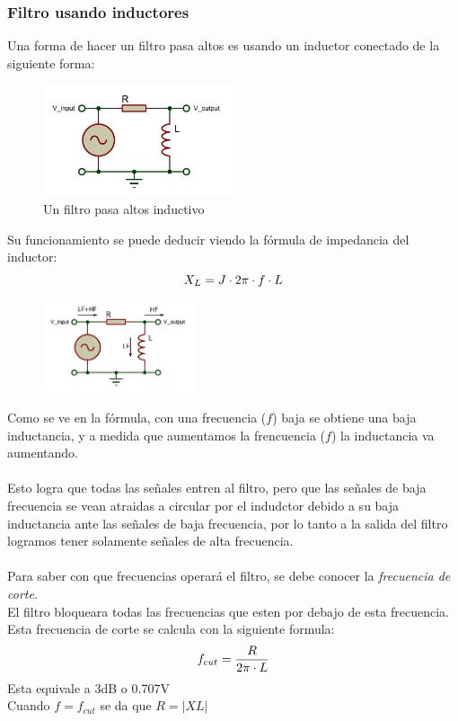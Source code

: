 \documentclass[../main.tex]{subfiles}
\begin{document}
		\clearpage
		\subsubsection{Filtro usando inductores}
		Una forma de hacer un filtro pasa altos es usando un inductor conectado 
		de la siguiente forma:
		\begin{figure}[H]
			\centering
			\includegraphics[width=0.5\textwidth]{filtros/pasa-alto_ind1.pdf}
			\caption{Un filtro pasa altos inductivo}

		\end{figure}
		Su funcionamiento se puede deducir viendo la fórmula de impedancia del inductor:
		\[
			X_L =J \cdot 2\pi \cdot f \cdot L
		\]
		\begin{figure}
			\centering
			\includegraphics[width=0.4\textwidth]{filtros/pasa-alto_ind2.pdf}
			\caption{}
		\end{figure}
		Como se ve en la fórmula, con una frecuencia ($f$) baja se obtiene una baja 
		inductancia, y a medida que aumentamos la frencuencia ($f$) la inductancia 
		va aumentando. \\\\
		Esto logra que todas las señales entren al filtro, pero que las señales de baja
		frecuencia se vean atraidas a circular por el indudctor debido a su baja inductancia
		ante las señales de baja frecuencia, por lo tanto a la salida del filtro logramos
		tener solamente señales de alta frecuencia. \\\\
		Para saber con que frecuencias operará el filtro, se debe conocer la
		\emph{frecuencia de corte}.\\
		El filtro bloqueara todas las frecuencias que esten por debajo 
		de esta frecuencia. \\
		Esta frecuencia de corte se calcula con la siguiente formula:
		\[
			f_{cut} = \dfrac{R}{2\pi \cdot L}
		\]
		Esta equivale a 3dB o 0.707V\\
		Cuando $f = f_{cut}$ se da que $R = \left | XL \right |$
\end{document}
